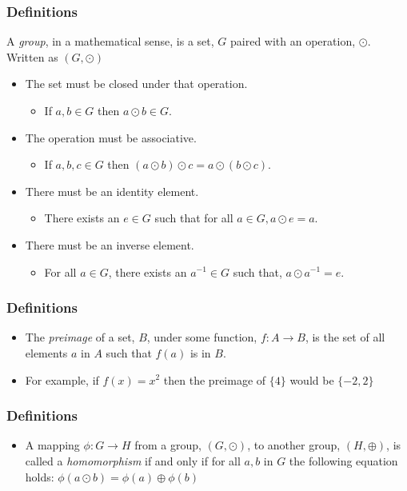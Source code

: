 \documentclass{beamer}
\begin{document}
\begin{frame}
	\frametitle{Definitions}
	
	 A \textit{group}, in a mathematical sense, is a set, $G$ paired with an 
		operation, $\odot$. Written as $(G, \odot)$
		
		\begin{itemize}
			\item The set must be closed under that operation.
				\begin{itemize} 
					\item If $a, b \in G$ then $a \odot b \in G$.
				\end{itemize}
			\item The operation must be associative.
				\begin{itemize} 
					\item If $a, b, c\in G$ then $(a \odot b) \odot c = a \odot (b \odot c)$.
				\end{itemize}
			\item There must be an identity element.
				\begin{itemize} 
					\item There exists an $e \in G$ such that for all $a \in G, a \odot e = a$.
				\end{itemize}
			\item There must be	an inverse element.
				\begin{itemize} 
					\item For all $a \in G$, there exists an $a^{-1} \in G$ such that, $a \odot a^{-1} = e$.
				\end{itemize}
		\end{itemize}
\end{frame}

\begin{frame}
	\frametitle{Definitions}
	\begin{itemize}
		\item The \textit{preimage} of a set, $B$, under some function,
		$f:A \rightarrow B$, is the set of all elements $a$ in $A$ such
		that $f(a)$ is in $B$.
		
		\item For example, if $f(x) = x^{2}$ then the preimage of $\{4\}$
		would be $\{-2, 2\}$
	\end{itemize}
	
\end{frame}



\begin{frame}
	\frametitle{Definitions}
	\begin{itemize}
		\item A mapping $\phi : G \rightarrow H$ from a group, $(G, \odot)$, 
		to another group,  $(H, \oplus)$, is called a \textit{homomorphism} 
		if and only if for all $a, b$ in $G$ the following equation holds:
		$\phi(a \odot b) = \phi(a) \oplus \phi(b)$
	\end{itemize}
\end{frame}
\end{document}
